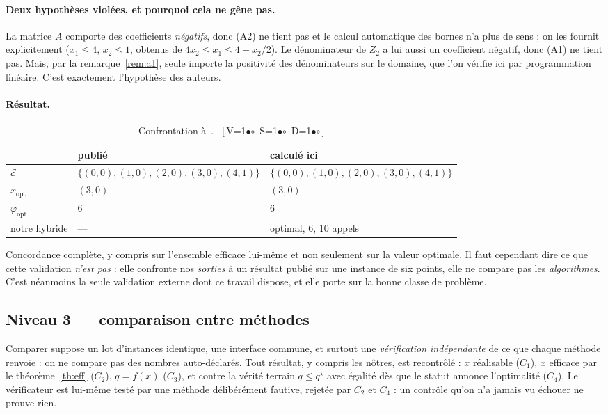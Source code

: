 \documentclass[11pt,a4paper]{article}
\theoremstyle{plain}
\theoremstyle{remark}
\newcommand{\Ecal}{\mathcal{E}}
\newcommand{\qs}{q^{\star}}
\newcommand{\cfgm}[1]{\ifnum#1=1$\bullet$\else$\circ$\fi}
\newcommand{\conf}[3]{%
  \textsf{\footnotesize[\,V\cfgm{#1}\ S\cfgm{#2}\ D\cfgm{#3}\,]}}
\begin{document}
\paragraph{Deux hypothèses violées, et pourquoi cela ne gêne pas.} La matrice
$A$ comporte des coefficients \emph{négatifs}, donc (A2) ne tient pas et le
calcul automatique des bornes n'a plus de sens ; on les fournit explicitement
($x_1\le 4$, $x_2\le 1$, obtenus de $4x_2\le x_1\le 4+x_2/2$). Le
dénominateur de $Z_2$ a lui aussi un coefficient négatif, donc (A1) ne tient
pas. Mais, par la remarque~\ref{rem:a1}, seule importe la positivité des
dénominateurs sur le domaine, que l'on vérifie ici par programmation
linéaire. C'est exactement l'hypothèse des auteurs.

\paragraph{Résultat.}

\begin{table}[H]
\centering
\caption{Confrontation à~\cite[section~5]{zerdani2011}.\ \conf{0}{0}{0}}
\label{tab:externe}
\begin{tabular}{lll}
\toprule
& publié & calculé ici\\
\midrule
$\Ecal$ & $\{(0,0),(1,0),(2,0),(3,0),(4,1)\}$
        & $\{(0,0),(1,0),(2,0),(3,0),(4,1)\}$\\
$x_{\text{opt}}$ & $(3,0)$ & $(3,0)$\\
$\varphi_{\text{opt}}$ & $6$ & $6$\\
notre hybride & --- & \textsf{optimal}, $6$, 10 appels\\
\bottomrule
\end{tabular}
\end{table}

\noindent
Concordance complète, y compris sur l'ensemble efficace lui-même et non
seulement sur la valeur optimale. Il faut cependant dire ce que cette
validation \emph{n'est pas} : elle confronte nos \emph{sorties} à un
résultat publié sur une instance de six points, elle ne compare pas les
\emph{algorithmes}. C'est néanmoins la seule validation externe dont ce
travail dispose, et elle porte sur la bonne classe de problème.

\subsection{Niveau 3 --- comparaison entre méthodes}

Comparer suppose un lot d'instances identique, une interface commune, et
surtout une \emph{vérification indépendante} de ce que chaque méthode
renvoie : on ne compare pas des nombres auto-déclarés. Tout résultat, y
compris les nôtres, est recontrôlé : $x$ réalisable ($C_1$), $x$ efficace par
le théorème~\ref{th:eff} ($C_2$), $q=f(x)$ ($C_3$), et contre la vérité
terrain $q\le\qs$ avec égalité dès que le statut annonce l'optimalité
($C_4$). Le vérificateur est lui-même testé par une méthode délibérément
fautive, rejetée par $C_2$ et $C_4$ : un contrôle qu'on n'a jamais vu échouer
ne prouve rien.
\end{document}
